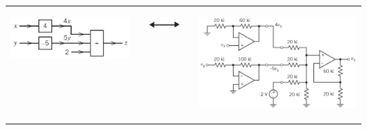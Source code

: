 \documentclass[aspectratio=169]{beamer}
\begin{document}
\begin{frame}[fragile]
\begin{tabular}{r}
	\begin{columns}
	      \begin{column}{.3\textwidth}  %
		\begin{center}
		  \includegraphics[height=.35\textwidth]{figura27.png}	
		\end{center}
	      \end{column}
	      \begin{column}{.1\textwidth}  %
		\begin{center}
		  \includegraphics[height=.4\textwidth]{figura29.JPG}	
		\end{center}
	      \end{column}	
	      \begin{column}{.5\textwidth}  %
		\begin{center}
		  \includegraphics[height=.5\textwidth]{figura28.png}	
		\end{center}
	      \end{column}	
		

\end{columns}
\end{tabular}
\end{frame}
\end{document}
